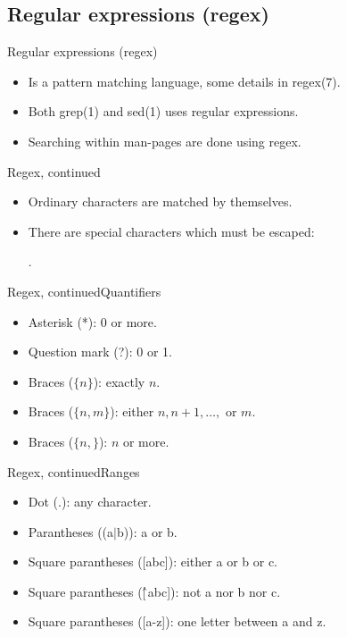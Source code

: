 \documentclass{beamer}
\begin{document}
\subsection{Regular expressions (regex)}
\begin{frame}{Regular expressions (regex)}
	\begin{itemize}
		\item Is a pattern matching language, some details in regex(7).
		\item Both grep(1) and sed(1) uses regular expressions.
		\item Searching within man-pages are done using regex.
	\end{itemize}
\end{frame}
\begin{frame}{Regex, continued}
	\begin{itemize}
		\item Ordinary characters are matched by themselves.
		\item There are special characters which must be escaped:
			\begin{center}
				.
			\end{center}
	\end{itemize}
\end{frame}
\begin{frame}{Regex, continued}{Quantifiers}
	\begin{itemize}
		\item Asterisk (*): 0 or more.
		\item Question mark (?): 0 or 1.
		\item Braces (\(\{n\}\)): exactly \(n\).
		\item Braces (\(\{n,m\}\)): either \(n, n+1, \ldots,\) or \(m\).
		\item Braces (\(\{n,\}\)): \(n\) or more.
	\end{itemize}
\end{frame}
\begin{frame}{Regex, continued}{Ranges}
	\begin{itemize}
		\item Dot (.): any character.
		\item Parantheses ((a$|$b)): a or b.
		\item Square parantheses ([abc]): either a or b or c.
		\item Square parantheses ([\^\,abc]): not a nor b nor c.
		\item Square parantheses ([a-z]): one letter between a and z.
	\end{itemize}
\end{frame}
\end{document}
